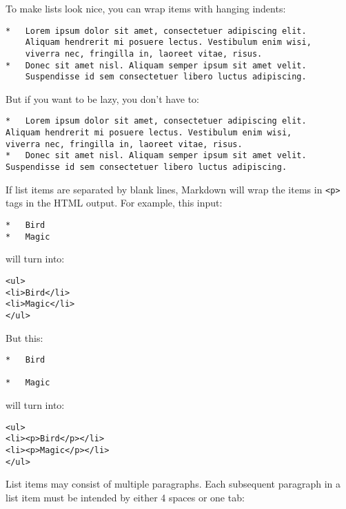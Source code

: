 To make lists look nice, you can wrap items with hanging indents:

\begin{lstlisting}
*   Lorem ipsum dolor sit amet, consectetuer adipiscing elit.
    Aliquam hendrerit mi posuere lectus. Vestibulum enim wisi,
    viverra nec, fringilla in, laoreet vitae, risus.
*   Donec sit amet nisl. Aliquam semper ipsum sit amet velit.
    Suspendisse id sem consectetuer libero luctus adipiscing.
\end{lstlisting}




But if you want to be lazy, you don't have to:

\begin{lstlisting}
*   Lorem ipsum dolor sit amet, consectetuer adipiscing elit.
Aliquam hendrerit mi posuere lectus. Vestibulum enim wisi,
viverra nec, fringilla in, laoreet vitae, risus.
*   Donec sit amet nisl. Aliquam semper ipsum sit amet velit.
Suspendisse id sem consectetuer libero luctus adipiscing.
\end{lstlisting}




If list items are separated by blank lines, Markdown will wrap the
items in \texttt{<p>} tags in the HTML output. For example, this input:

\begin{lstlisting}
*   Bird
*   Magic
\end{lstlisting}




will turn into:

\begin{lstlisting}
<ul>
<li>Bird</li>
<li>Magic</li>
</ul>
\end{lstlisting}




But this:

\begin{lstlisting}
*   Bird

*   Magic
\end{lstlisting}




will turn into:

\begin{lstlisting}
<ul>
<li><p>Bird</p></li>
<li><p>Magic</p></li>
</ul>
\end{lstlisting}




List items may consist of multiple paragraphs. Each subsequent
paragraph in a list item must be intended by either 4 spaces
or one tab:

